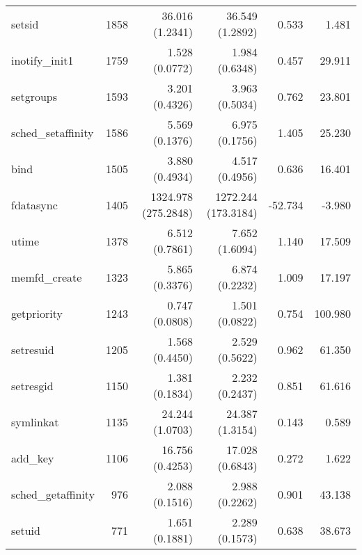 \begin{longtable}{>{\ttfamily}lrrrrr}
                         setsid &       1858 &             36.016 (1.2341) &           36.549 (1.2892) &           0.533 &        1.481 \\
                 inotify\_init1 &       1759 &              1.528 (0.0772) &            1.984 (0.6348) &           0.457 &       29.911 \\
                      setgroups &       1593 &              3.201 (0.4326) &            3.963 (0.5034) &           0.762 &       23.801 \\
             sched\_setaffinity &       1586 &              5.569 (0.1376) &            6.975 (0.1756) &           1.405 &       25.230 \\
                           bind &       1505 &              3.880 (0.4934) &            4.517 (0.4956) &           0.636 &       16.401 \\
                      fdatasync &       1405 &         1324.978 (275.2848) &       1272.244 (173.3184) &         -52.734 &       -3.980 \\
                          utime &       1378 &              6.512 (0.7861) &            7.652 (1.6094) &           1.140 &       17.509 \\
                  memfd\_create &       1323 &              5.865 (0.3376) &            6.874 (0.2232) &           1.009 &       17.197 \\
                    getpriority &       1243 &              0.747 (0.0808) &            1.501 (0.0822) &           0.754 &      100.980 \\
                      setresuid &       1205 &              1.568 (0.4450) &            2.529 (0.5622) &           0.962 &       61.350 \\
                      setresgid &       1150 &              1.381 (0.1834) &            2.232 (0.2437) &           0.851 &       61.616 \\
                      symlinkat &       1135 &             24.244 (1.0703) &           24.387 (1.3154) &           0.143 &        0.589 \\
                       add\_key &       1106 &             16.756 (0.4253) &           17.028 (0.6843) &           0.272 &        1.622 \\
             sched\_getaffinity &        976 &              2.088 (0.1516) &            2.988 (0.2262) &           0.901 &       43.138 \\
                         setuid &        771 &              1.651 (0.1881) &            2.289 (0.1573) &           0.638 &       38.673 \\

\end{longtable}
